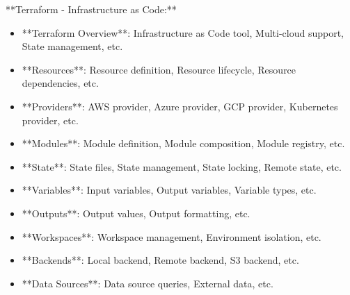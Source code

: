 \documentclass[11pt,a4paper]{article}
\begin{document}
**Terraform - Infrastructure as Code:**

\begin{itemize}
\item **Terraform Overview**: Infrastructure as Code tool, Multi-cloud support, State management, etc.
\end{itemize}

\begin{itemize}
\item **Resources**: Resource definition, Resource lifecycle, Resource dependencies, etc.
\end{itemize}

\begin{itemize}
\item **Providers**: AWS provider, Azure provider, GCP provider, Kubernetes provider, etc.
\end{itemize}

\begin{itemize}
\item **Modules**: Module definition, Module composition, Module registry, etc.
\end{itemize}

\begin{itemize}
\item **State**: State files, State management, State locking, Remote state, etc.
\end{itemize}

\begin{itemize}
\item **Variables**: Input variables, Output variables, Variable types, etc.
\end{itemize}

\begin{itemize}
\item **Outputs**: Output values, Output formatting, etc.
\end{itemize}

\begin{itemize}
\item **Workspaces**: Workspace management, Environment isolation, etc.
\end{itemize}

\begin{itemize}
\item **Backends**: Local backend, Remote backend, S3 backend, etc.
\end{itemize}

\begin{itemize}
\item **Data Sources**: Data source queries, External data, etc.
\end{itemize}
\end{document}
